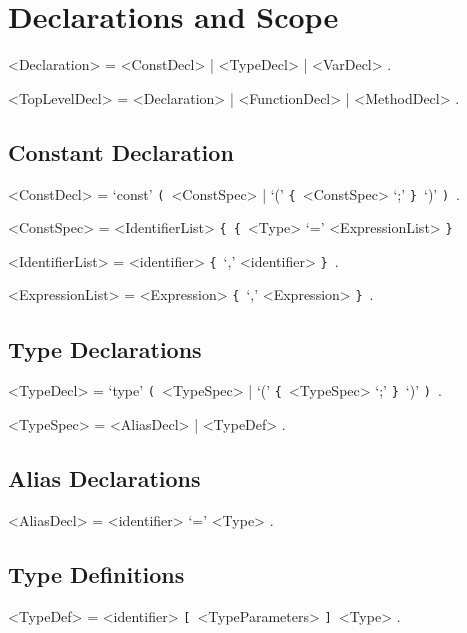\documentclass{article}
\def\lrep{\synshortsoff\texttt{\{}\synshorts~}
\def\rrep{\synshortsoff\texttt{\}}\synshorts~}
\def\lopt{\synshortsoff\texttt{[}\synshorts~}
\def\ropt{\synshortsoff\texttt{]}\synshorts~}
\def\lgrp{\synshortsoff\texttt{(}\synshorts~}
\def\rgrp{\synshortsoff\texttt{)}\synshorts~}
\begin{document}
\section*{Declarations and Scope} 
\begin{grammar} 
	<Declaration> = <ConstDecl> | <TypeDecl> | <VarDecl> .

	<TopLevelDecl> = <Declaration> | <FunctionDecl> | <MethodDecl> . 
\end{grammar} 


\subsection*{Constant Declaration}
\begin{grammar}
	<ConstDecl> = `const' \lgrp <ConstSpec> | `(' \lrep <ConstSpec> `;' \rrep `)' \rgrp .

	<ConstSpec> = <IdentifierList> \lrep \lrep <Type> `=' <ExpressionList> \rrep

	<IdentifierList> = <identifier> \lrep `,' <identifier> \rrep . 

	<ExpressionList> = <Expression> \lrep `,' <Expression> \rrep . 
\end{grammar} 

\subsection*{Type Declarations} 
\begin{grammar} 
	<TypeDecl> = `type' \lgrp <TypeSpec>  | `(' \lrep <TypeSpec> `;' \rrep `)' \rgrp .

	<TypeSpec> = <AliasDecl> | <TypeDef>  .
\end{grammar} 

\subsection*{Alias Declarations}
\begin{grammar} 
	<AliasDecl> = <identifier> `=' <Type> . 
\end{grammar}


\subsection*{Type Definitions}
\begin{grammar} 
	<TypeDef> = <identifier> \lopt <TypeParameters> \ropt  <Type> .
\end{grammar}
\end{document}
